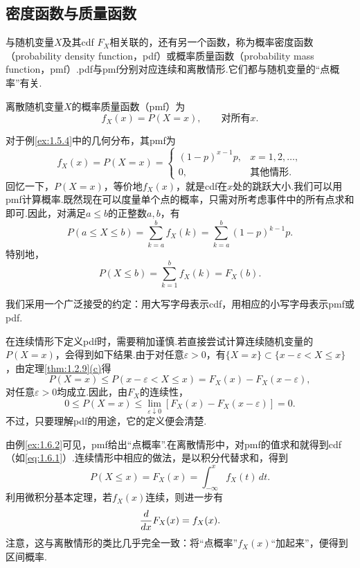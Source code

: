 \subsection{密度函数与质量函数}\label{sec:1.6}
与随机变量$X$及其cdf $F_X$相关联的，还有另一个函数，称为概率密度函数（probability density function，pdf）或概率质量函数（probability mass function，pmf）.pdf与pmf分别对应连续和离散情形.它们都与随机变量的“点概率”有关.
\begin{definition}\label{def:1.6.1}
离散随机变量$X$的概率质量函数（pmf）为
$$f_X(x)=P(X=x),\qquad\text{对所有$x$}.$$
\end{definition}

\begin{example}[几何分布的概率]\label{ex:1.6.2}
对于例\ref{ex:1.5.4}中的几何分布，其pmf为
$$f_X(x)=P(X=x)=\begin{cases}(1-p)^{x-1}p,&x=1,2,\ldots,\\0,&\text{其他情形}.
\end{cases}$$
回忆一下，$P(X=x)$，等价地$f_X(x)$，就是cdf在$x$处的跳跃大小.我们可以用pmf计算概率.既然现在可以度量单个点的概率，只需对所考虑事件中的所有点求和即可.因此，对满足$a\le b$的正整数$a,b$，有
$$P(a\le X\le b)=\sum_{k=a}^b f_X(k)=\sum_{k=a}^b(1-p)^{k-1}p.$$
特别地，
\begin{equation}\label{eq:1.6.1}P(X\le b)=\sum_{k=1}^b f_X(k)=F_X(b).\end{equation}
\end{example}

我们采用一个广泛接受的约定：用大写字母表示cdf，用相应的小写字母表示pmf或pdf.

在连续情形下定义pdf时，需要稍加谨慎.若直接尝试计算连续随机变量的$P(X=x)$，会得到如下结果.由于对任意$\varepsilon>0$，有$\{X=x\}\subset\{x-\varepsilon<X\le x\}$，由定理\ref{thm:1.2.9}\hyperref[itm:thm:1.2.9:c]{(c)}得
$$P(X=x)\le P(x-\varepsilon<X\le x)=F_X(x)-F_X(x-\varepsilon),$$
对任意$\varepsilon>0$均成立.因此，由$F_X$的连续性，
$$0\le P(X=x)\le\lim_{\varepsilon\downarrow0}[F_X(x)-F_X(x-\varepsilon)]=0.$$
不过，只要理解pdf的用途，它的定义便会清楚.

由例\ref{ex:1.6.2}可见，pmf给出“点概率”.在离散情形中，对pmf的值求和就得到cdf（如\eqref{eq:1.6.1}）.连续情形中相应的做法，是以积分代替求和，得到
$$P(X\le x)=F_X(x)=\int_{-\infty}^x f_X(t)\,dt.$$
利用微积分基本定理，若$f_X(x)$连续，则进一步有
\begin{equation}\label{eq:1.6.2}\index{SI0448@微积分基本定理}\frac d{dx}F_X(x)=f_X(x).\end{equation}
注意，这与离散情形的类比几乎完全一致：将“点概率”$f_X(x)$“加起来”，便得到区间概率.

